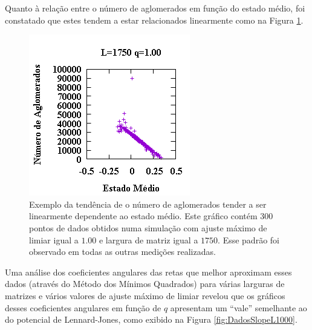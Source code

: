 \documentclass[11pt,a4paper,twocolumn,final]{article}
\begin{document}
Quanto à relação entre o número de aglomerados em função do estado médio, foi constatado que estes tendem a estar relacionados linearmente como na Figura \ref{fig:dataL1750Q100ClustersVsAvgState}. 
\begin{figure}[h]
    \centering
    \includegraphics[width=.9\linewidth]{dataL1750Q100ClustersVsAvgState.png}
    \caption{Exemplo da tendência de o número de aglomerados tender a ser linearmente dependente ao estado médio. Este gráfico contém 300 pontos de dados obtidos numa simulação com ajuste máximo de limiar igual a $1.00$ e largura de matriz igual a $1750$. Esse padrão foi observado em todas as outras medições realizadas.}
    \label{fig:dataL1750Q100ClustersVsAvgState}
\end{figure}
Uma análise dos coeficientes angulares das retas que melhor aproximam esses dados (através do Método dos Mínimos Quadrados) para várias larguras de matrizes e vários valores de ajuste máximo de limiar revelou que os gráficos desses coeficientes angulares em função de $q$ apresentam um ``vale'' semelhante ao do potencial de Lennard-Jones, como exibido na Figura \ref{fig:DadosSlopeL1000}.
\end{document}
